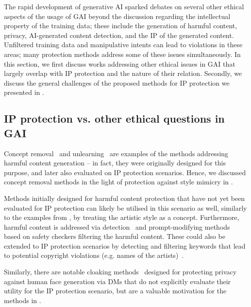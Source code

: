 The rapid development of generative AI sparked debates on several other ethical aspects of the usage of GAI beyond the discussion regarding the intellectual property of the training data; these include the generation of harmful content, privacy, AI-generated content detection, and the IP of the generated content. 
Unfiltered training data and manipulative intents can lead to violations in these areas; many protection methods address some of these issues simultaneously. 
In this section, we first discuss works addressing other ethical issues in GAI that largely overlap with IP protection and the nature of their relation. 
Secondly, we discuss the general challenges of the proposed methods for IP protection we presented in .

\subsection{IP protection vs. other ethical questions in GAI}
Concept removal~\cite{liu_geom-erasing_2023,ho_classifier-free_2022} and unlearning~\cite{wu_erasediff_2024} are examples of the methods addressing harmful content generation -- in fact, they were originally designed for this purpose, and later also evaluated on IP protection scenarios.
Hence, we discussed concept removal methods in the light of protection against style mimicry in . 

Methods initially designed for harmful content protection that have not yet been evaluated for IP protection can likely be utilised in this scenario as well, similarly to the examples from , by treating the artistic style as a concept.
Furthermore, harmful content is addressed via detection~\cite{rando_red-teaming_2022} and prompt-modifying methods~\cite{hanu_detoxify_2020} based on safety checkers filtering the harmful content. 
These could also be extended to IP protection scenarios by detecting and filtering keywords that lead to potential copyright violations (e.g. names of the artists)~\cite{noauthor_openai_2023}.

Similarly, there are notable cloaking methods~\cite{wu_towards_2023} designed for protecting privacy against human face generation via DMs that do not explicitly evaluate their utility for the IP protection scenario, but are a valuable motivation for the methods in .

